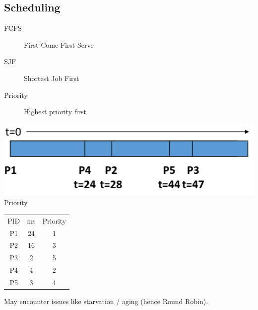 \documentclass[a4paper]{article}
\begin{document}
\begin{multicols*}{2}
    \vspace*{-2em}
    \subsection*{Scheduling}
    \begin{multicols*}{2}
        \begin{description}
            \item[FCFS] First Come First Serve
            \item[SJF] Shortest Job First
            \item[Priority] Highest priority first
        \end{description}
        \begin{center}
            \includegraphics[width=\columnwidth]{result.png}
            Priority
        \end{center}
        \columnbreak
        \begin{tabular}{|c|c|c|}
            \hline
            PID & ms & Priority \\
            P1  & 24 & 1        \\
            P2  & 16 & 3        \\
            P3  & 2  & 5        \\
            P4  & 4  & 2        \\
            P5  & 3  & 4        \\
            \hline
        \end{tabular}
    \end{multicols*}
    \vspace*{-2em}
    May encounter issues like starvation / aging (hence Round Robin).

    \begin{flushright}
        \vspace*{-1em}

\end{flushright}
\end{multicols*}
\end{document}
